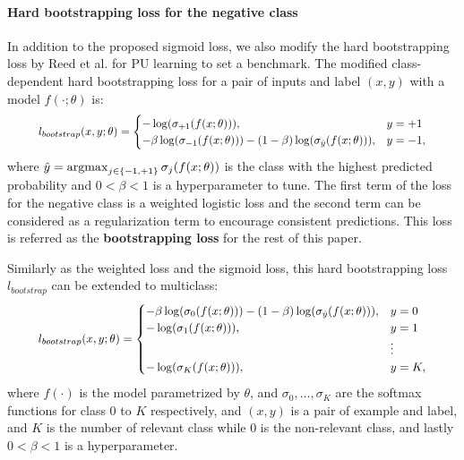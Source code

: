\paragraph{Hard bootstrapping loss for the negative class}
In addition to the proposed sigmoid loss, we also modify the hard bootstrapping loss by Reed et al. \cite{reed2014training} for PU learning to set a benchmark.
The modified class-dependent hard bootstrapping loss for a pair of inputs and label $(x,y)$ with a model $f(\cdot;\theta)$ is:
\begin{eqnarray}
\resizebox{0.9\columnwidth}{!}{$
  l_{bootstrap}(x, y; \theta) =
    \begin{cases}
      - \log (\sigma_{+1}(f(x; \theta))) , & y = +1 \\
      - \beta \log (\sigma_{-1}(f(x; \theta))) - (1-\beta) \log (\sigma_{\hat{y}}(f(x; \theta))), & y = -1,
    \end{cases}
$}
\end{eqnarray}
where $\hat{y} = \operatorname*{argmax}_{j\in\{-1,+1\}}{\sigma_{j}(f(x; \theta))}$ is the class with the highest predicted probability and $0<\beta<1$ is a hyperparameter to tune.
The first term of the loss for the negative class is a weighted logistic loss and the second term can be considered as a regularization term to encourage consistent predictions.
This loss is referred as the \textbf{bootstrapping loss} for the rest of this paper.

Similarly as the weighted loss and the sigmoid loss, this hard bootstrapping loss $l_{bootstrap}$ can be extended to multiclass:
\begin{eqnarray}
\resizebox{0.9\columnwidth}{!}{$
l_{bootstrap}(x, y; \theta) =
  \begin{cases}
    - \beta \log (\sigma_{0}(f(x; \theta))) - (1-\beta) \log (\sigma_{\hat{y}}(f(x; \theta))), & y = 0 \\
    - \log (\sigma_1(f(x;\theta))), & y = 1 \\
                                   & \vdots \\
    - \log (\sigma_K(f(x;\theta))), & y = K,
  \end{cases}
  $}
\end{eqnarray}
where $f(\cdot)$ is the model parametrized by $\theta$, and $\sigma_0, \dots, \sigma_K$ are the softmax functions for class $0$ to $K$ respectively, and $(x,y)$ is a pair of example and label, and $K$ is the number of relevant class while $0$ is the non-relevant class, and lastly $0<\beta<1$ is a hyperparameter.


